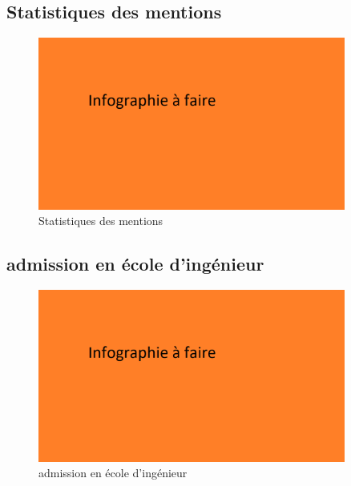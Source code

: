 \documentclass[aspectratio=169]{beamer}
\begin{document}
\subsection{Statistiques des mentions}

\begin{frame}
    \begin{figure}
        \centering
        \includegraphics[width=0.9\textwidth]{ressource_diapo/place older.png}
        \caption{Statistiques des mentions}
    \end{figure}
\end{frame}

\subsection{admission en école d'ingénieur}

\begin{frame}
    \begin{figure}
        \centering
        \includegraphics[width=0.9\textwidth]{ressource_diapo/place older.png}
        \caption{admission en école d'ingénieur}
    \end{figure}
\end{frame}
\end{document}

